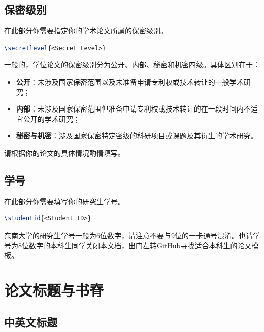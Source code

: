 \subsection{保密级别}

在此部分你需要指定你的学术论文所属的保密级别。

\begin{tcolorbox}
\begin{lstlisting}[language=TeX]
\secretlevel{<Secret Level>}
\end{lstlisting}
\end{tcolorbox}

\noindent 一般的，学位论文的保密级别分为公开、内部、秘密和机密四级。具体区别在于：

\begin{itemize}
  \item \textbf{公开}：未涉及国家保密范围以及未准备申请专利权或技术转让的一般学术研究；
  \item \textbf{内部}：未涉及国家保密范围但准备申请专利权或技术转让的在一段时间内不适宜公开的学术研究；
  \item \textbf{秘密与机密}：涉及国家保密特定密级的科研项目或课题及其衍生的学术研究。
\end{itemize}

\noindent 请根据你的论文的具体情况酌情填写。

\subsection{学号}

在此部分你需要填写你的研究生学号。

\begin{tcolorbox}
\begin{lstlisting}[language=TeX]
\studentid{<Student ID>}
\end{lstlisting}
\end{tcolorbox}

\noindent 东南大学的研究生学号一般为6位数字，请注意不要与9位的一卡通号混淆。也请学号为8位数字的本科生同学关闭本文档，出门左转GitHub寻找适合本科生的论文模板。

\section{论文标题与书脊}

\subsection{中英文标题}

